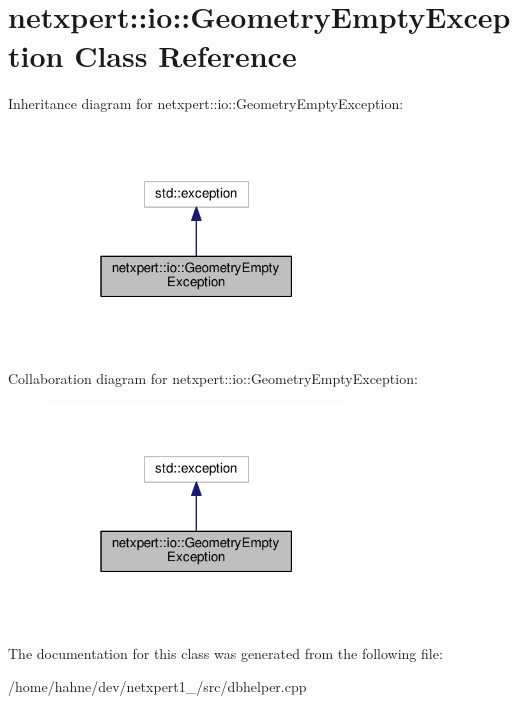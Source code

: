 \hypertarget{classnetxpert_1_1io_1_1GeometryEmptyException}{}\section{netxpert\+:\+:io\+:\+:Geometry\+Empty\+Exception Class Reference}
\label{classnetxpert_1_1io_1_1GeometryEmptyException}


Inheritance diagram for netxpert\+:\+:io\+:\+:Geometry\+Empty\+Exception\+:\nopagebreak
\begin{figure}[H]
\begin{center}
\leavevmode
\includegraphics[width=223pt]{classnetxpert_1_1io_1_1GeometryEmptyException__inherit__graph}
\end{center}
\end{figure}


Collaboration diagram for netxpert\+:\+:io\+:\+:Geometry\+Empty\+Exception\+:\nopagebreak
\begin{figure}[H]
\begin{center}
\leavevmode
\includegraphics[width=223pt]{classnetxpert_1_1io_1_1GeometryEmptyException__coll__graph}
\end{center}
\end{figure}


The documentation for this class was generated from the following file\+:\begin{DoxyCompactItemize}
\item 
/home/hahne/dev/netxpert1\+\_/src/dbhelper.\+cpp\end{DoxyCompactItemize}
